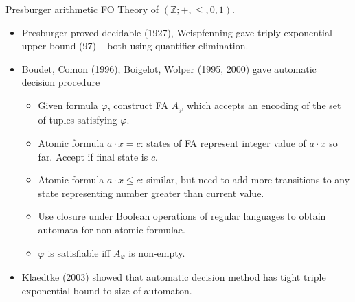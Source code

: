 \documentclass[style=fyma
 ]{powerdot}
\begin{document}
\begin{slide}{Presburger arithmetic}
  \vspace{-15pt}
  FO Theory of $(\mathbb{Z}; +, \leq, 0, 1)$.
  \begin{itemize}
  \vspace{-5pt}
    \item Presburger proved decidable (1927), Weispfenning gave triply exponential upper bound (97) -- both using quantifier elimination. \pause
    \item Boudet, Comon (1996), Boigelot, Wolper (1995, 2000) gave automatic decision procedure
    \begin{itemize}
      \item Given formula $\varphi$, construct FA $A_{\varphi}$ which accepts an encoding of the set of tuples satisfying $\varphi$.
      \item Atomic formula $\bar{a} \cdot \bar{x} = c$: states of FA represent integer value of $\bar{a} \cdot \bar{x}$ so far.  Accept if final state is $c$.
      \item Atomic formula $\bar{a} \cdot \bar{x} \leq c$: similar, but need to add more transitions to any state representing number greater than current value.
      \item Use closure under Boolean operations of regular languages to obtain automata for non-atomic formulae.
      \item $\varphi$ is satisfiable iff $A_{\varphi}$ is non-empty.
    \end{itemize}
    \vspace{-5pt}\pause
    \item Klaedtke (2003) showed that automatic decision method has tight triple exponential bound to size of automaton.  
  \end{itemize}
\end{slide}
\end{document}
